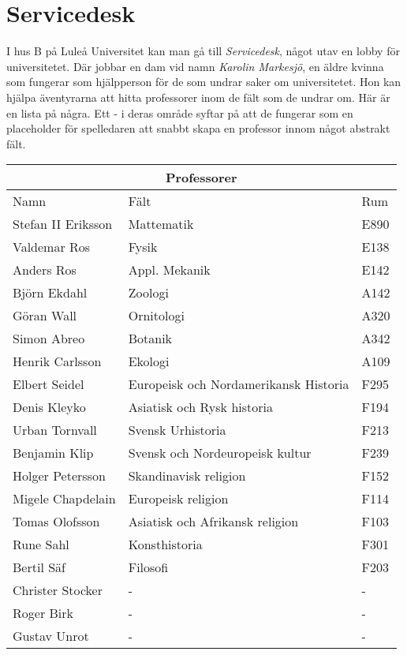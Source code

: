 \section{Servicedesk}

I hus B på Luleå Universitet kan man gå till \textit{Servicedesk}, något utav en lobby för universitetet. Där jobbar en dam vid namn \textit{Karolin Markesjö}, en äldre kvinna som fungerar som hjälpperson för de som undrar saker om universitetet. Hon kan hjälpa äventyrarna att hitta professorer inom de fält som de undrar om. Här är en lista på några. Ett - i deras område syftar på att de fungerar som en placeholder för spelledaren att snabbt skapa en professor innom något abstrakt fält.

\begin{center}
	\begin{tabular}{ |p{3cm}|p{3cm}|p{3cm}|  }
		\hline
		\multicolumn{3}{|c|}{Professorer} \\
		\hline
		Namn & Fält & Rum \\ 
		\hline
		Stefan II Eriksson & Mattematik & E890 \\
		Valdemar Ros & Fysik & E138 \\
		Anders Ros & Appl. Mekanik & E142 \\
		Björn Ekdahl & Zoologi & A142 \\
		Göran Wall & Ornitologi & A320 \\
		Simon Abreo & Botanik & A342 \\
		Henrik Carlsson & Ekologi & A109 \\
		Elbert Seidel & Europeisk och Nordamerikansk Historia & F295 \\
		Denis Kleyko & Asiatisk och Rysk historia & F194 \\
		Urban Tornvall & Svensk Urhistoria & F213 \\
		Benjamin Klip & Svensk och Nordeuropeisk kultur & F239 \\
		Holger Petersson & Skandinavisk religion & F152 \\
		Migele Chapdelain & Europeisk religion & F114 \\
		Tomas Olofsson & Asiatisk och Afrikansk religion & F103 \\
		Rune Sahl & Konsthistoria & F301 \\
		Bertil Säf & Filosofi & F203 \\
		Christer Stocker & - & - \\
		Roger Birk & - & - \\
		Gustav Unrot & - & - \\
		\hline
	\end{tabular}
\end{center}

